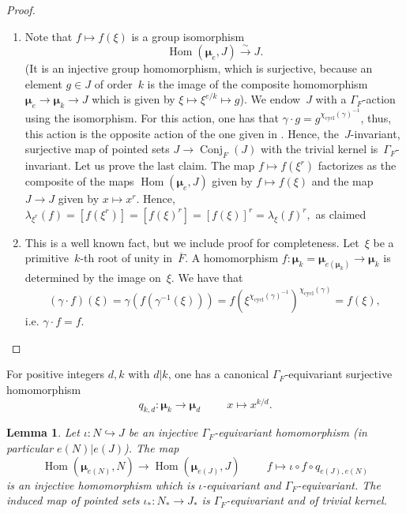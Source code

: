 \documentclass[a4paper,english,12pt]{amsart}
\newcommand{\oF}{\overline F}
\newcommand{\muu}{\boldsymbol{\mu}}
\DeclareMathOperator{\Conj}{Conj}
\DeclareMathOperator{\Hom}{Hom}
\DeclareMathOperator{\cycl}{cycl}
\newtheorem{lem}[equation]{Lemma}
\numberwithin{equation}{subsection}
\begin{document}
\begin{proof}
\begin{enumerate}
\item Note that $f\mapsto f(\xi)$ is a group isomorphism $$\Hom(\muu_e, J)\xrightarrow{\sim} J.$$ (It is an injective group homomorphism, which is surjective, because an element $g\in J$ of order~$k$ is the image of the composite homomorphism $\muu_e\to\muu_k\to J$ which is given by $\xi\mapsto \xi^{e/k}\mapsto g$). We endow~$J$ with a $\Gamma_F$-action using the isomorphism. For this action, one has that $\gamma\cdot g=g^{\chi_{\cycl}(\gamma)^{-1}}$, thus, this action is the opposite action of the one given in \cite[Section 2]{Malle}. Hence, the~$J$-invariant, surjective map of pointed sets $J\to \Conj_F(J)$ with the trivial kernel is~$\Gamma_F$-invariant.  Let us prove the last claim.  The map $f\mapsto f(\xi^r)$ factorizes as the composite of the maps $\Hom(\muu_e,J)$ given by $f\mapsto f(\xi)$ and the map $J\to J$ given by $x\mapsto x^r$. Hence, $\lambda_{\xi^r}(f)=[f(\xi^r)]=[f(\xi)^r]=[f(\xi)]^r=\lambda_\xi(f)^r,$ as claimed
\item This is a well known fact, but we include proof for completeness. Let~$\xi$ be a primitive~$k$-th root of unity in~$\oF$. A homomorphism $f:\muu_k=\muu_{e(\muu_k)}\to \muu_k$ is determined by the image on~$\xi$. We have that $$(\gamma\cdot f)(\xi)=\gamma(f(\gamma^{-1}(\xi)))=f(\xi^{\chi_{\cycl}(\gamma)^{-1}})^{\chi_{\cycl}(\gamma)}=f(\xi),$$i.e. $\gamma\cdot f=f$.
\end{enumerate}
\end{proof}
For positive integers $d,k$ with $d|k$, one has a canonical $\Gamma_F$-equivariant surjective homomorphism $$q_{k,d}:\muu_k\to\muu_d\hspace{1cm}x\mapsto x^{k/d}.$$
\begin{lem}\label{funcinj}
Let $\iota:N\hookrightarrow J$ be an injective $\Gamma_F$-equivariant homomorphism (in particular $e(N)|e(J)$). The map $$\Hom(\muu_{e(N)}, N)\to\Hom(\muu_{e(J)},J)\hspace{1cm}f\mapsto \iota\circ f\circ q_{e(J), e(N)}$$ is an injective homomorphism which is $\iota$-equivariant and $\Gamma_F$-equivariant. The induced map of pointed sets $\iota_*:N_*\to J_*$ is $\Gamma_F$-equivariant and of trivial kernel.
\end{lem}
\end{document}
